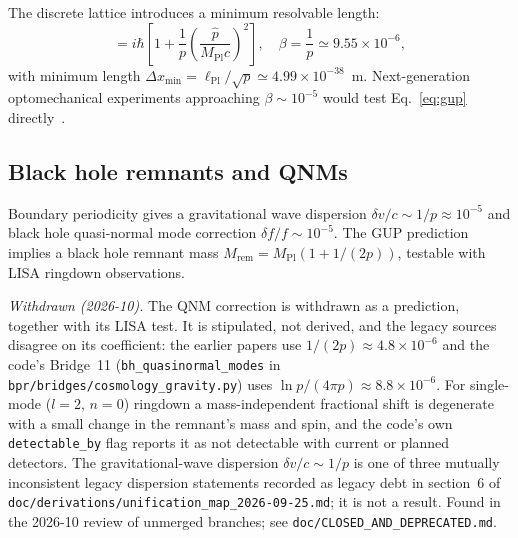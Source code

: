 \documentclass[aps,prd,twocolumn,superscriptaddress,longbibliography,nofootinbib]{revtex4-2}
\newcommand{\MPl}{M_{\mathrm{Pl}}}
\newcommand{\lP}{\ell_{\mathrm{Pl}}}
\begin{document}
The discrete lattice introduces a minimum resolvable length:
\begin{equation}
[\hat{x},\hat{p}] = i\hbar\left[1 + \frac{1}{p}\left(\frac{\hat{p}}{\MPl c}\right)^2\right],
\quad \beta = \frac{1}{p} \simeq 9.55 \times 10^{-6},
\label{eq:gup}
\end{equation}
with minimum length $\Delta x_{\min} = \lP/\!\sqrt{p} \simeq 4.99\times10^{-38}$~m.
Next-generation optomechanical experiments approaching $\beta \sim 10^{-5}$
would test Eq.~\eqref{eq:gup} directly~\cite{Bawaj2015}.

\subsection{Black hole remnants and QNMs}

Boundary periodicity gives a gravitational wave dispersion
$\delta v/c \sim 1/p \approx 10^{-5}$ and black hole quasi-normal mode
correction $\delta f/f \sim 10^{-5}$.  The GUP prediction implies a
black hole remnant mass $M_{\mathrm{rem}} = \MPl(1 + 1/(2p))$, testable
with LISA ringdown observations.

\textit{Withdrawn (2026-10).}  The QNM correction is withdrawn as a
prediction, together with its LISA test.  It is stipulated, not
derived, and the legacy sources disagree on its coefficient: the
earlier papers use $1/(2p) \approx 4.8\times10^{-6}$ and the code's
Bridge~11 (\texttt{bh\_quasinormal\_modes} in
\texttt{bpr/bridges/cosmology\_gravity.py}) uses $\ln p/(4\pi p)
\approx 8.8\times10^{-6}$.  For single-mode ($l=2$, $n=0$) ringdown a
mass-independent fractional shift is degenerate with a small change
in the remnant's mass and spin, and the code's own
\texttt{detectable\_by} flag reports it as not detectable with current
or planned detectors.  The gravitational-wave dispersion
$\delta v/c \sim 1/p$ is one of three mutually inconsistent legacy
dispersion statements recorded as legacy debt in section~6 of
\texttt{doc/derivations/unification\_map\_2026-09-25.md}; it is not a
result.  Found in the 2026-10 review of unmerged branches; see
\texttt{doc/CLOSED\_AND\_DEPRECATED.md}.
\end{document}
